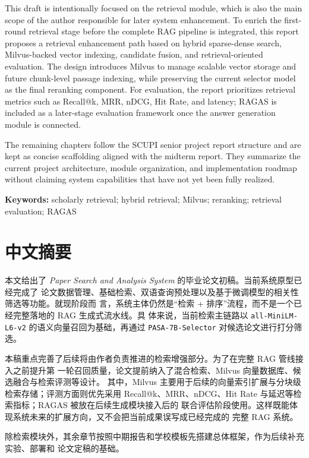 \documentclass[11pt,a4paper,oneside]{report}
\begin{document}
This draft is intentionally focused on the retrieval module, which is also the main
scope of the author responsible for later system enhancement. To enrich the first-round
retrieval stage before the complete RAG pipeline is integrated, this report proposes a
retrieval enhancement path based on hybrid sparse-dense search, Milvus-backed vector
indexing, candidate fusion, and retrieval-oriented evaluation. The design introduces
Milvus to manage scalable vector storage and future chunk-level passage indexing,
while preserving the current selector model as the final reranking component. For
evaluation, the report prioritizes retrieval metrics such as Recall@k, MRR, nDCG,
Hit Rate, and latency; RAGAS is included as a later-stage evaluation framework once
the answer generation module is connected.

The remaining chapters follow the SCUPI senior project report structure and are kept
as concise scaffolding aligned with the midterm report. They summarize the current
project architecture, module organization, and implementation roadmap without
claiming system capabilities that have not yet been fully realized.

\noindent\textbf{Keywords:} scholarly retrieval; hybrid retrieval; Milvus; reranking;
retrieval evaluation; RAGAS

\chapter*{中文摘要}

本文给出了 \textit{Paper Search and Analysis System} 的毕业论文初稿。当前系统原型已经完成了
论文数据管理、基础检索、双语查询预处理以及基于微调模型的相关性筛选等功能。就现阶段而
言，系统主体仍然是“检索 + 排序”流程，而不是一个已经完整落地的 RAG 生成式流水线。具
体来说，当前检索主链路以 \texttt{all-MiniLM-L6-v2} 的语义向量召回为基础，再通过
\texttt{PASA-7B-Selector} 对候选论文进行打分筛选。

本稿重点完善了后续将由作者负责推进的检索增强部分。为了在完整 RAG 管线接入之前提升第
一轮召回质量，论文提前纳入了混合检索、Milvus 向量数据库、候选融合与检索评测等设计。
其中，Milvus 主要用于后续的向量索引扩展与分块级检索存储；评测方面则优先采用
Recall@k、MRR、nDCG、Hit Rate 与延迟等检索指标；RAGAS 被放在后续生成模块接入后的
联合评估阶段使用。这样既能体现系统未来的扩展方向，又不会把当前成果误写成已经完成的
完整 RAG 系统。

除检索模块外，其余章节按照中期报告和学校模板先搭建总体框架，作为后续补充实验、部署和
论文定稿的基础。
\end{document}
